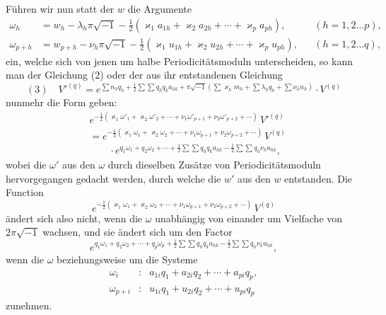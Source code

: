 \documentclass[10pt]{article}
\begin{document}
Führen wir nun statt der \(w\) die Argumente
\[
\begin{aligned}
\omega_h&=w_h-\lambda_h\pi\sqrt{-1}-\frac12(\varkappa_1a_{1h}+\varkappa_2a_{2h}+\cdots+\varkappa_pa_{ph}),
&& (h=1,2\ldots p),\\
\omega_{p+h}&=w_{p+h}-\nu_h\pi\sqrt{-1}-\frac12(\varkappa_1u_{1h}+\varkappa_2u_{2h}+\cdots+\varkappa_pu_{ph}),
&& (h=1,2\ldots q),
\end{aligned}
\]
ein, welche sich von jenen um halbe Periodicitätsmoduln unterscheiden, so kann man der Gleichung (2) oder der aus ihr entstandenen Gleichung
\[
(3)\quad
V'^{(q)}=
 e^{\sum n_hq_h+\frac12\sum\sum q_hq_ka_{hk}+
 \pi\sqrt{-1}(\sum\varkappa_hm_h+\sum\lambda_hq_h+\sum\nu_hn_h)}\cdot V^{(q)}
\]
nunmehr die Form geben:
\[
\begin{aligned}
&e^{-\frac12(\varkappa_1\omega'_1+\varkappa_2\omega'_2+\cdots+\nu_1\omega'_{p+1}+\nu_2\omega'_{p+2}+\cdots)}\,V'^{(q)}\\
&=e^{-\frac12(\varkappa_1\omega_1+\varkappa_2\omega_2+\cdots+\nu_1\omega_{p+1}+\nu_2\omega_{p+2}+\cdots)}\,V^{(q)}\\
&\qquad\cdot e^{q_1\omega_1+q_2\omega_2+\cdots+\frac12\sum\sum q_hq_ka_{hk}-\frac12\sum\sum q_h\nu_ku_{hk}},
\end{aligned}
\]
wobei die \(\omega'\) aus den \(\omega\) durch dieselben Zusätze von Periodicitätsmoduln hervorgegangen gedacht werden, durch welche die \(w'\) aus den \(w\) entstanden. Die Function
\[
e^{-\frac12(\varkappa_1\omega_1+\varkappa_2\omega_2+\cdots+\nu_1\omega_{p+1}+\nu_2\omega_{p+2}+\cdots)}\,V^{(q)}
\]
ändert sich also nicht, wenn die \(\omega\) unabhängig von einander um Vielfache von \(2\pi\sqrt{-1}\) wachsen, und sie ändert sich um den Factor
\[
e^{q_1\omega_1+q_2\omega_2+\cdots+q_p\omega_p+\frac12\sum\sum q_hq_ka_{hk}-\frac12\sum\sum q_h\nu_ku_{hk}},
\]
wenn die \(\omega\) beziehungsweise um die Systeme
\[
\begin{array}{rcl}
\omega_i&:&a_{1i}q_1+a_{2i}q_2+\cdots+a_{pi}q_p,\\
\omega_{p+i}&:&u_{1i}q_1+u_{2i}q_2+\cdots+u_{pi}q_p
\end{array}
\]
zunehmen.
\end{document}
